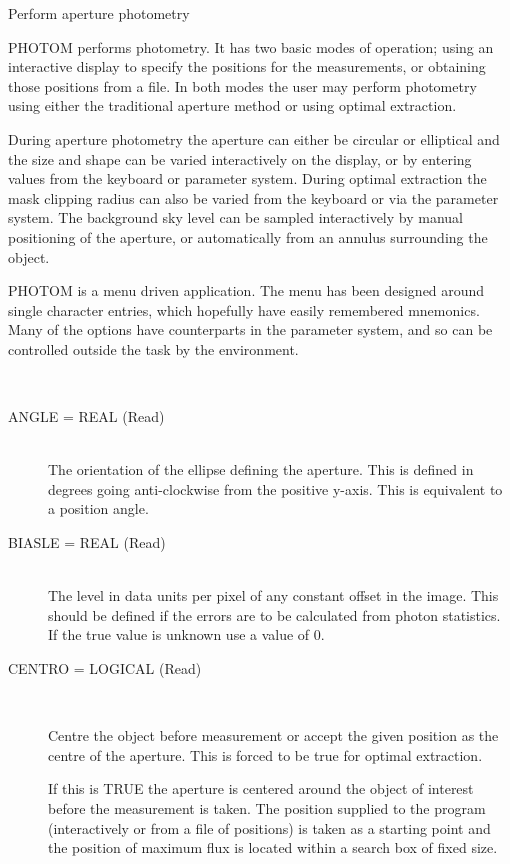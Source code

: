 \documentclass[twoside,11pt]{article}
\renewcommand{\_}{\texttt{\symbol{95}}}
\newcommand{\sstdescription}[1]{\item[Description:] #1}
\newcommand{\sstparameters}[1]{
   \item[Parameters:] \mbox{} \\
   \vspace{-3.5ex}
   \begin{description}
      #1
   \end{description}
}
\newcommand{\sstsubsection}[1]{ \item[{#1}] \mbox{} \\}
\newcommand{\sstdescription}[1]{\item[Description:]
      \begin{description}
         #1
      \end{description}
      \\
   }
\newcommand{\sstparameters}[1]{
      \item[Parameters:] \\
      \begin{description}
         #1
      \end{description}
      \\
   }
\newcommand{\sstsubsection}[1]{\item[{#1}]}
\begin{document}
{
   Perform aperture photometry
}{
   \sstdescription{
      PHOTOM performs photometry. It has two basic modes of operation; 
      using an interactive display to specify the positions for the
      measurements, or obtaining those positions from a file. In both
      modes the user may perform photometry using either the traditional
      aperture method or using optimal extraction.
   
      During aperture photometry the aperture can either be circular
      or elliptical and the size and shape can be varied interactively 
      on the display, or by entering values from the keyboard or parameter 
      system. During optimal extraction the mask clipping radius can also
      be varied from the keyboard or via the parameter system. The 
      background sky level can be sampled interactively by manual 
      positioning of the aperture, or automatically from an annulus 
      surrounding the object.

      PHOTOM is a menu driven application. The menu has been designed
      around single character entries, which hopefully have easily
      remembered mnemonics. Many of the options have counterparts in the
      parameter system, and so can be controlled outside the task by the
      environment.
   }
   \sstparameters{
      \sstsubsection{
         ANGLE = \_REAL (Read)
      }{
         The orientation of the ellipse defining the aperture. This is
         defined in degrees going anti-clockwise from the positive
         y-axis. This is equivalent to a position angle.
      }
      \sstsubsection{
         BIASLE = \_REAL (Read)
      }{
         The level in data units per pixel of any constant offset in
         the image. This should be defined if the errors are to be
         calculated from photon statistics. If the true value is unknown
         use a value of 0.
      }
      \sstsubsection{
         CENTRO = \_LOGICAL (Read)
      }{
         Centre the object before measurement or accept the given
         position as the centre of the aperture. This is forced to
         be true for optimal extraction.

         If this is TRUE the aperture is centered around the object of
         interest before the measurement is taken. The position supplied
         to the program (interactively or from a file of positions) is
         taken as a starting point and the position of maximum flux is
         located within a search box of fixed size.

}}}
\end{document}

